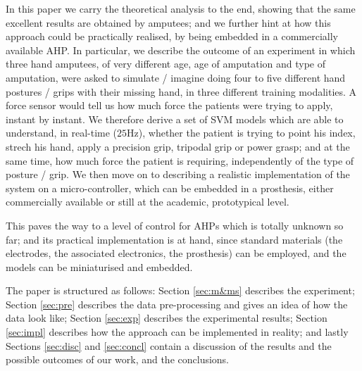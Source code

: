 In this paper we carry the theoretical analysis to the end, showing
that the same excellent results are obtained by amputees; and we
further hint at how this approach could be practically realised, by
being embedded in a commercially available AHP. In particular, we
describe the outcome of an experiment in which three hand amputees, of
very different age, age of amputation and type of amputation, were
asked to simulate / imagine doing four to five different hand postures
/ grips with their missing hand, in three different training
modalities. A force sensor would tell us how much force the patients
were trying to apply, instant by instant. We therefore derive a set of
SVM models which are able to understand, in real-time ($25$Hz),
whether the patient is trying to point his index, strech his hand,
apply a precision grip, tripodal grip or power grasp; and at the same
time, how much force the patient is requiring, independently of the
type of posture / grip. We then move on to describing a realistic
implementation of the system on a micro-controller, which can be
embedded in a prosthesis, either commercially available or still at
the academic, prototypical level.

This paves the way to a level of control for AHPs which is totally
unknown so far; and its practical implementation is at hand, since
standard materials (the electrodes, the associated electronics, the
prosthesis) can be employed, and the models can be miniaturised and
embedded.

The paper is structured as follows: Section \ref{sec:m&ms} describes
the experiment; Section \ref{sec:pre} describes the data
pre-processing and gives an idea of how the data look like; Section
\ref{sec:exp} describes the experimental results; Section
\ref{sec:impl} describes how the approach can be implemented in
reality; and lastly Sections \ref{sec:disc} and \ref{sec:concl}
contain a discussion of the results and the possible outcomes of our
work, and the conclusions.
